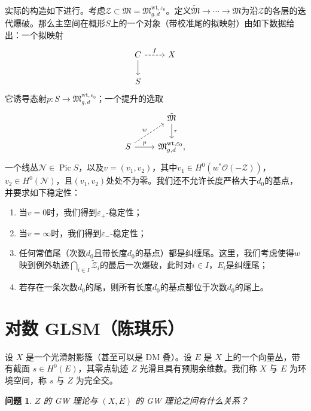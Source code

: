 \documentclass{amsart}
\newtheorem{quest}[thm]{问题}
\theoremstyle{definition}
\theoremstyle{remark}
\theoremstyle{plain}
\theoremstyle{definition}
\theoremstyle{remark}
\newcommand{\ep}{\varepsilon}
\newcommand{\mc}[1]{\mathcal{#1}}
\newcommand{\mf}[1]{\mathfrak{#1}}
\newcommand{\mr}[1]{\mathrm{#1}}
\newcommand{\1}{\mathbf{1}}
\newcommand{\2}{\mathbf{2}}
\newcommand{\3}{\mathbf{3}}
\DeclareMathOperator{\Pic}{Pic}
\begin{document}
实际的构造如下进行。考虑\(\mc{Z} \subset \mf{M} = \mf{M}_{g,d}^{\mr{wt}, \ep_0}\)。定义\(\tilde{\mf{M}} \to \cdots \to \mf{M}\)为沿\(\mc{Z}\)的各层的迭代爆破。那么主空间在概形\(S\)上的一个对象（带校准尾的拟映射）由如下数据给出：一个拟映射
\begin{equation*}
\begin{tikzcd}
    C \ar{d} \ar[dashrightarrow]{r}{f} & X \\
    S
\end{tikzcd}
\end{equation*}
它诱导态射\(p \colon S \to \mf{M}_{g,d}^{\mr{wt}, \ep_0}\)；一个提升的选取
\begin{equation*}
\begin{tikzcd}
    & \tilde{\mf{M}} \ar{d}{\tau} \\
    S \ar{r}{p} \ar[dashrightarrow]{ur}{w} & \mf{M}_{g,d}^{\mr{wt}, \ep_0},
\end{tikzcd}
\end{equation*}
一个线丛\(\mc{N} \in \Pic S\)，以及\(v = (v_1, v_2)\)，其中\(v_1 \in H^0(w^* \mc{O}(-\mc{Z}))\)，\(v_2 \in H^0(\mc{N})\)，且\((v_1, v_2)\)处处不为零。我们还不允许长度严格大于\(d_0\)的基点，并要求如下稳定性：
\begin{enumerate}
    \item 当\(v = 0\)时，我们得到\(\ep_+\)-稳定性；
    \item 当\(v = \infty\)时，我们得到\(\ep_-\)-稳定性；
    \item 任何常值尾（次数\(d_0\)且带长度\(d_0\)的基点）都是纠缠尾。这里，我们考虑使得\(w\)映到例外轨迹\(\bigcap_{i \in I} \tilde{\mc{Z}}_i\)的最后一次爆破，此时对\(i \in I\)，\(E_i\)是纠缠尾；
    \item 若存在一条次数\(d_0\)的尾，则所有长度\(d_0\)的基点都位于次数\(d_0\)的尾上。
\end{enumerate}






\section{对数 GLSM（陈琪乐）}%
\label{sec:Log GLSM (Qile Chen)}

设 \(X\) 是一个光滑射影簇（甚至可以是 DM 叠）。设 \(E\) 是 \(X\) 上的一个向量丛，带有截面 \(s \in H^0(E)\)，其零点轨迹 \(Z\) 光滑且具有预期余维数。我们称 \(X\) 与 \(E\) 为环境空间，称 \(s\) 与 \(Z\) 为完全交。

\begin{quest}
    \(Z\) 的 GW 理论与 \((X, E)\) 的 GW 理论之间有什么关系？
\end{quest}
\end{document}

